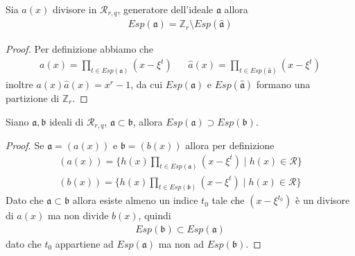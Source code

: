 \begin{prop}
   Sia $a(x)$ divisore in $\mathcal{R}_{r,q}$, generatore dell'ideale $\mathfrak{a}$ allora
   \begin{align*}
      Esp(\mathfrak{a}) = \mathbb{Z}_{r} \setminus Esp(\hat{\mathfrak{a}}) 
   \end{align*}
\end{prop}
\begin{proof}
   Per definizione abbiamo che
   \begin{align*}
      a(x) = \prod_{ t \in Esp(\mathfrak{a}) } (x - \xi^{t}) 
      & &
      \hat{a}(x) = \prod_{ t \in Esp(\hat{\mathfrak{a}}) } (x - \xi^{t}) 
   \end{align*}
   inoltre $a(x) \hat{a}(x) = x^r-1$, da cui $Esp(\mathfrak{a})$ e $Esp(\hat{\mathfrak{a}}) $ formano una partizione di $\mathbb{Z}_{r}$.
\end{proof}
\begin{prop}
   Siano $\mathfrak{a}, \mathfrak{b}$ ideali di $\mathcal{R}_{r,q}$, $\mathfrak{a} \subset \mathfrak{b}$, allora 
   $Esp(\mathfrak{a}) \supset Esp(\mathfrak{b})$.
\end{prop}
\begin{proof}
   Se $\mathfrak{a} = (a(x))$ e $\mathfrak{b} = (b(x))$ allora per definizione
   \begin{align*}
      (a(x)) 
      = \lbrace h(x)\prod_{ t \in Esp(\mathfrak{a}) } (x - \xi^{t}) \mid h(x) \in \mathcal{R} \rbrace
      \\
      (b(x)) 
      = \lbrace h(x)\prod_{ t \in Esp(\mathfrak{b}) } (x - \xi^{t}) \mid h(x) \in \mathcal{R} \rbrace
   \end{align*}
   Dato che $\mathfrak{a} \subset \mathfrak{b}$ allora esiste almeno un indice $t_{0}$ tale che $(x - \xi^{t_{0}}) $ è un divisore di $a(x)$ ma non divide $b(x)$, quindi
   \begin{align*}
      Esp(\mathfrak{b}) \subset Esp(\mathfrak{a}) 
   \end{align*}
   dato che $t_{0}$ appartiene ad $Esp(\mathfrak{a})$ ma non ad $Esp(\mathfrak{b})$.
\end{proof}

